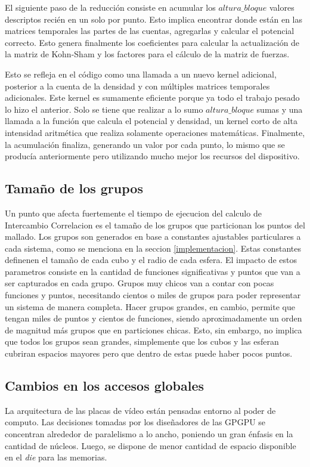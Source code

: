 El siguiente paso de la reducci\'on consiste en acumular los $altura\_{bloque}$ valores descriptos
reci\'en en un solo por punto. Esto implica encontrar donde est\'an en las matrices temporales las
partes de las cuentas, agregarlas y calcular el potencial correcto. Esto genera finalmente los
coeficientes para calcular la actualizaci\'on de la matriz de Kohn-Sham y los factores para el
c\'alculo de la matriz de fuerzas.

Esto se refleja en el c\'odigo como una llamada a un nuevo kernel adicional, posterior a la
cuenta de la densidad y con m\'ultiples matrices temporales adicionales. Este kernel es sumamente
eficiente porque ya todo el trabajo pesado lo hizo el anterior. Solo se tiene que realizar
a lo sumo $altura\_{bloque}$ sumas y una llamada a la funci\'on que calcula el potencial y densidad,
un kernel corto de alta intensidad aritm\'etica que realiza solamente operaciones matem\'aticas.
Finalmente, la acumulaci\'on finaliza, generando un valor por cada punto, lo mismo que se produc\'ia
anteriormente pero utilizando mucho mejor los recursos del dispositivo.



\subsection{Tama\~no de los grupos}
Un punto que afecta fuertemente el tiempo de ejecucion del calculo de Intercambio Correlacion
es el tama\~no de los grupos que particionan los puntos del mallado. Los grupos son generados
en base a constantes ajustables particulares a cada sistema, como se menciona en la seccion \ref{implementacion}.
Estas constantes definenen el tama\~no de cada cubo y el radio de cada esfera. El impacto de
estos parametros consiste en la cantidad de funciones significativas y puntos que van a ser
capturados en cada grupo. Grupos muy chicos van a contar con pocas funciones y puntos, necesitando
cientos o miles de grupos para poder representar un sistema de manera completa. Hacer grupos grandes,
en cambio, permite que tengan miles de puntos y cientos de funciones, siendo aproximadamente un orden
de magnitud m\'as grupos que en particiones chicas. Esto, sin embargo, no implica que todos
los grupos sean grandes, simplemente que los cubos y las esferan cubriran espacios mayores
pero que dentro de estas puede haber pocos puntos.




\subsection{Cambios en los accesos globales}
La arquitectura de las placas de v\'ideo est\'an pensadas entorno al poder de computo.
Las decisiones tomadas por los dise\~nadores de las GPGPU se concentran alrededor
de paralelismo a lo ancho, poniendo un gran \'enfasis en la cantidad de n\'ucleos. Luego,
se dispone de menor cantidad de espacio disponible en el \textit{die} para las memorias.

